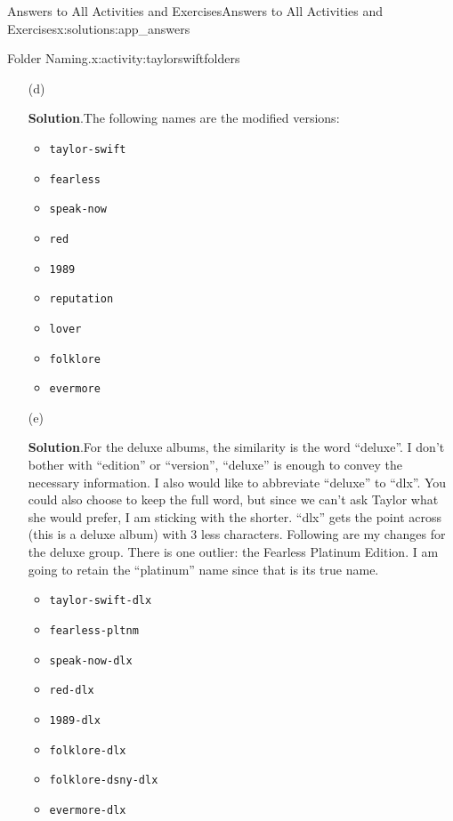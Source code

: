 \documentclass[oneside,10pt,]{book}
\newcommand{\blocktitlefont}{\relax}
\newcommand{\mono}[1]{\texttt{#1}}
\begin{document}
\begin{solutions-chapter}{Answers to All Activities and Exercises}{}{Answers to All Activities and Exercises}{}{}{x:solutions:app_answers}
\begin{activitysolution}{1.1}{Folder Naming.}{x:activity:taylorswiftfolders}
\begin{enumerate}[font=\bfseries,label=(\alph*),ref=\alph*]
\item[(d)]\par\smallskip%
\noindent\textbf{\blocktitlefont Solution}.\hypertarget{g:solution:idp615110312-back}{}\quad{}The following names are the modified versions:%
\begin{multicols}{2}
\begin{itemize}[label=\textbullet]
\item{}\mono{taylor-swift}%
\item{}\mono{fearless}%
\item{}\mono{speak-now}%
\item{}\mono{red}%
\item{}\mono{1989}%
\item{}\mono{reputation}%
\item{}\mono{lover}%
\item{}\mono{folklore}%
\item{}\mono{evermore}%
\end{itemize}
\end{multicols}
%
\item[(e)]\par\smallskip%
\noindent\textbf{\blocktitlefont Solution}.\hypertarget{g:solution:idp615121704-back}{}\quad{}For the deluxe albums, the similarity is the word ``deluxe''. I don't bother with ``edition'' or ``version'', ``deluxe'' is enough to convey the necessary information. I also would like to abbreviate ``deluxe'' to ``dlx''. You could also choose to keep the full word, but since we can't ask Taylor what she would prefer, I am sticking with the shorter. ``dlx'' gets the point across (this is a deluxe album) with 3 less characters. Following are my changes for the deluxe group. There is one outlier: the Fearless Platinum Edition. I am going to retain the ``platinum'' name since that is its true name.%
\begin{multicols}{2}
\begin{itemize}[label=\textbullet]
\item{}\mono{taylor-swift-dlx}%
\item{}\mono{fearless-pltnm}%
\item{}\mono{speak-now-dlx}%
\item{}\mono{red-dlx}%
\item{}\mono{1989-dlx}%
\item{}\mono{folklore-dlx}%
\item{}\mono{folklore-dsny-dlx}%
\item{}\mono{evermore-dlx}%
\end{itemize}

\end{multicols}
\end{enumerate}
\end{activitysolution}
\end{solutions-chapter}
\end{document}
